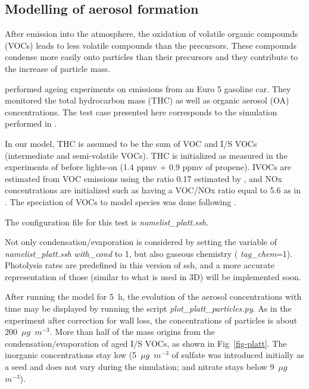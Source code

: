 \documentclass[a4paper,11pt]{article}
\begin{document}
\subsection{Modelling of aerosol formation}

After emission into the atmosphere, the oxidation of volatile organic compounds (VOCs) leads to less volatile compounds than the precursors. 
These compounds condense more easily onto particles than their precursors and they contribute to the increase of particle mass.

\cite{platt2013secondary} performed ageing experiments on emissions from an Euro 5 gasoline car. They monitored the total hydrocarbon mass (THC) as well as organic aerosol (OA) concentrations. 
The test case presented here corresponds to the simulation performed in \cite{sartelet2018emission}.

In our model, THC is assumed to be the sum of VOC and I/S VOCs (intermediate and semi-volatile VOCs). THC is initialized as measured in the experiments of \cite{platt2013secondary} before lights-on (1.4 ppmv + 0.9 ppmv of propene). IVOCs are estimated from VOC emissions using the ratio 0.17 estimated by \cite{zhao2016intermediate}, and NOx concentrations are initialized such as having a VOC/NOx ratio equal to 5.6 as in \cite{platt2013secondary} . 
The speciation of VOCs to model species was done following \cite{theloke2007compilation}.

The configuration file for this test is {\it{namelist\_platt.ssh}}.

Not only condensation/evaporation is considered by setting the variable of {\it{namelist\_platt.ssh}} {\it{with\_cond}} to 1, but also gaseous chemistry ( {\it{tag\_chem}}=1). Photolysis rates are predefined in this version of ssh, and a more accurate representation of those (similar to what is used in 3D) will be implemented soon.

After running the model for 5~h, the evolution of the aerosol concentrations with time may be displayed by running the script {\it{plot\_platt\_particles.py}}.
As in the experiment after correction for wall loss, the concentrations of
particles is about 200~$\mu g$~$m^{-3}$. More than half of the mass origins
from the condensation/evaporation of aged I/S VOCs, as shown in Fig~\ref{fig-platt}.
The inorganic concentrations stay low (5~$\mu g$~$m^{-3}$ of sulfate was introduced initially as a seed and does not vary during the simulation; and nitrate stays below 9~$\mu g$~$m^{-3}$).
\end{document}

